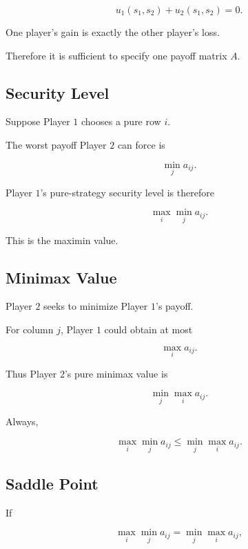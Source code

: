 \[
\boxed{
u_1(s_1,s_2)
+
u_2(s_1,s_2)
=
0.
}
\]

One player's gain is exactly the other player's loss.

Therefore it is sufficient to specify one payoff matrix \(A\).

\subsection{Security Level}
\label{subsec:security-level}

Suppose Player \(1\) chooses a pure row \(i\).

The worst payoff Player \(2\) can force is

\[
\min_j
a_{ij}.
\]

Player \(1\)'s pure-strategy security level is therefore

\[
\boxed{
\max_i
\min_j
a_{ij}.
}
\]

This is the maximin value.

\subsection{Minimax Value}
\label{subsec:minimax-value-zero-sum}

Player \(2\) seeks to minimize Player \(1\)'s payoff.

For column \(j\), Player \(1\) could obtain at most

\[
\max_i
a_{ij}.
\]

Thus Player \(2\)'s pure minimax value is

\[
\boxed{
\min_j
\max_i
a_{ij}.
}
\]

Always,

\[
\boxed{
\max_i\min_j a_{ij}
\leq
\min_j\max_i a_{ij}.
}
\]

\subsection{Saddle Point}
\label{subsec:game-saddle-point}

If

\[
\boxed{
\max_i\min_j a_{ij}
=
\min_j\max_i a_{ij},
}
\]

